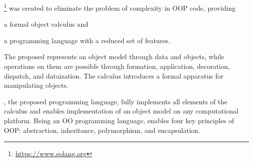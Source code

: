 
\eolang{}\footnote{\url{https://www.eolang.org}}
was created to eliminate the problem of complexity in
OOP code, providing
\begin{inparaenum}[1)]
  \item a formal object calculus and
  \item a programming language with a reduced set of features.
\end{inparaenum}
The proposed \phic{} represents an object model through
data and objects, while operations on them are possible
through formation, application, decoration, dispatch, and dataization. The calculus
introduces a formal apparatus for manipulating objects.

\eolang{}, the proposed programming language, fully implements
all elements of the calculus and enables implementation of
an object model on any computational platform.
Being an OO programming language, \eolang{} enables four key principles of OOP:
abstraction, inheritance, polymorphism, and encapsulation.
